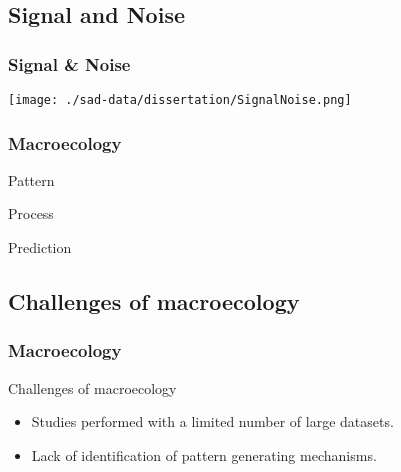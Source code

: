 \documentclass[14pt]{beamer}
\begin{document}
\subsection{Signal and Noise}
\begin{frame}[t]
\frametitle{Signal \& Noise}
\begin{center}
\texttt{[image: ./sad-data/dissertation/SignalNoise.png]}
\end{center}
\end{frame}

\begin{frame}
\frametitle{Macroecology}
\begin{Huge}
\begin{center}

Pattern 

\MVArrowDown{}  

Process  

\MVArrowDown{}
 
Prediction

\end{center}
\end{Huge}
\end{frame}

\subsection{Challenges of macroecology}
\begin{frame}[t]
\frametitle{Macroecology}
Challenges of macroecology\\
\begin{itemize}
\item Studies performed with a limited number of large datasets.
\item Lack of identification of pattern generating mechanisms.
\end{itemize}
\end{frame}
\end{document}
